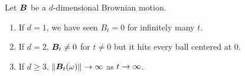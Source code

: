 \begin{rmk}
    Let $\boldsymbol{B}$ be a $d$-dimensional Brownian motion.
    \begin{enumerate}[label=(\arabic{*})]
        \item If $d = 1$, we have seen $B_t = 0$ for infinitely many $t$.
        \item If $d = 2$, $\boldsymbol{B}_t \neq 0$ for $t \neq 0$ but it hits every ball centered at $0$.
        \item If $d \geq 3$, $\left\lVert\boldsymbol{B}_t(\omega)\right\lVert \rightarrow \infty$ as $t \rightarrow \infty$.
    \end{enumerate}
\end{rmk}

